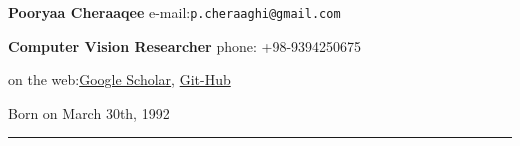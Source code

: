 \documentclass{letter}
\begin{document}

\textbf{{\huge Pooryaa Cheraaqee}} \hfill \llap e-mail:\texttt{p.cheraaghi@gmail.com}

\textbf{{Computer Vision Researcher}} \hfill \llap phone: +98-9394250675

\hfill \llap on the web:\href{https://scholar.google.com/citations?user=ebSTTkAAAAAJ&hl=en&oi=ao}{Google Scholar}, \href{https://github.com/cheraaqee}{Git-Hub}

\hfill \llap Born on March 30th, 1992

\noindent \rule{18cm}{3pt}
\end{document}
